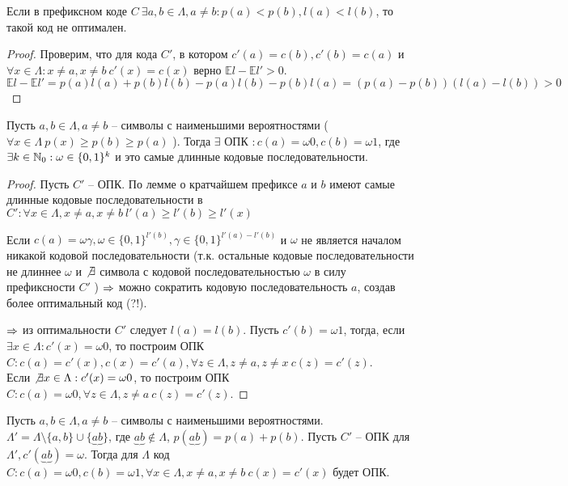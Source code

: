 	\begin{Lm}
		Если в префиксном коде $C \ \exists a, b \in \Lambda, a \neq b : p(a) < p(b), l(a) < l(b)$, то такой код не оптимален.
	\end{Lm}

	\begin{proof}
		Проверим, что для кода $C'$, в котором $c'(a) = c(b), c'(b) = c(a)$ и $\forall x \in \Lambda : x \neq a, x \neq b \ c'(x) = c(x)$ верно $\mathbb{E}l - \mathbb{E}l' > 0$.
		\[\mathbb{E} l - \mathbb{E} l' = p(a) l(a) + p(b) l(b) - p(a) l(b) - p(b) l(a) = (p(a) - p(b))(l(a) - l(b)) > 0\] 
	\end{proof}

	\begin{Lm}
		Пусть $a, b \in \Lambda, a \neq b$ -- символы с наименьшими вероятностями ( $\forall x \in \Lambda \ p(x) \geqslant p(b) \geqslant p(a)$ ). 
		Тогда $\exists $ ОПК $: c(a) = \omega 0, c(b) = \omega 1$, где $\exists k \in \mathbb{N}_0 : \omega \in \{0, 1\}^k$ и это самые длинные кодовые последовательности.
	\end{Lm}

	\begin{proof}
		Пусть $C'$ -- ОПК. По лемме о кратчайшем префиксе $a$ и $b$ имеют самые длинные кодовые последовательности в $C' : \forall x \in \Lambda, x \neq a, x \neq b \ l'(a) \geqslant l'(b) \geqslant l'(x)$
		
		Если $c(a) = \omega \gamma, \omega \in \{0, 1\}^{l'(b)}, \gamma \in \{0, 1\}^{l'(a) - l'(b)}$ и $\omega$ не является началом никакой кодовой последовательности
		(т.к. остальные кодовые последовательности не длиннее $\omega$ и $\not\exists $ символа с кодовой последовательностью $\omega$ в силу префиксности $C'$ ) $\Rightarrow$ 
		можно сократить кодовую последовательность $a$, создав более оптимальный код (?!).

		$\Rightarrow$ из оптимальности $C'$ следует $l(a) = l(b)$. Пусть $c'(b) = \omega 1$, тогда, если 
		$\exists x \in \Lambda : c'(x) = \omega 0$, то построим ОПК $C : c(a) = c'(x), c(x) = c'(a), \forall z \in \Lambda, z \neq a, z \neq x \ c(z) = c'(z)$. \\
		Если $\not\exists x \in \Lambda : c'(x) = \omega0$, то построим ОПК $C : c(a) = \omega0, \forall z \in \Lambda, z \neq a \ c(z) = c'(z)$.
	\end{proof}

	\begin{Lm}
		Пусть $a, b \in \Lambda, a \neq b$ -- символы с наименьшими вероятностями.
		$\Lambda' = \Lambda \setminus \{a, b\} \cup \{\underbrace{ab}\}$, где $\underbrace{ab} \notin \Lambda$, $p(\underbrace{ab}) = p(a) + p(b)$.
		Пусть $C'$ -- ОПК для $\Lambda', c'(\underbrace{ab}) = \omega$. Тогда для $\Lambda$ код $C : c(a) = \omega 0, c(b) = \omega 1, \forall x \in \Lambda, x \neq a, x \neq b \ c(x) = c'(x)$ будет ОПК.
	\end{Lm}

